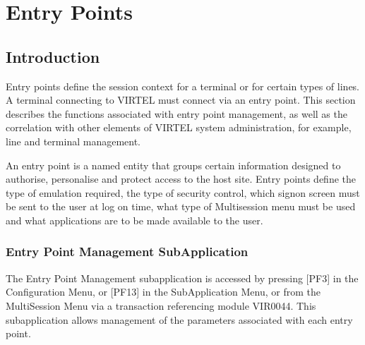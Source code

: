 \documentclass[letterpaper,10pt,english]{sphinxmanual}
\begin{document}
\ignorespaces 

\chapter{Entry Points}
\label{\detokenize{connectivity_guide:entry-points}}\label{\detokenize{connectivity_guide:index-102}}

\section{Introduction}
\label{\detokenize{connectivity_guide:id54}}
\sphinxAtStartPar
Entry points define the session context for a terminal or for certain types of lines. A terminal connecting to VIRTEL must connect via an entry point. This section describes the functions associated with entry point management, as well as the correlation with other elements of VIRTEL system administration, for example, line and terminal management.

\sphinxAtStartPar
An entry point is a named entity that groups certain information designed to authorise, personalise and protect access to the host site. Entry points define the type of emulation required, the type of security control, which sign\sphinxhyphen{}on screen must be sent to the user at log on time, what type of Multi\sphinxhyphen{}session menu must be used and what applications are to be made available to the user.

\ignorespaces 

\subsection{Entry Point Management Sub\sphinxhyphen{}Application}
\label{\detokenize{connectivity_guide:entry-point-management-sub-application}}\label{\detokenize{connectivity_guide:index-103}}
\sphinxAtStartPar
The Entry Point Management sub\sphinxhyphen{}application is accessed by pressing {[}PF3{]} in the Configuration Menu, or {[}PF13{]} in the Sub\sphinxhyphen{}Application Menu, or from the Multi\sphinxhyphen{}Session Menu via a transaction referencing module VIR0044. This subapplication allows management of the parameters associated with each entry point.
\end{document}
